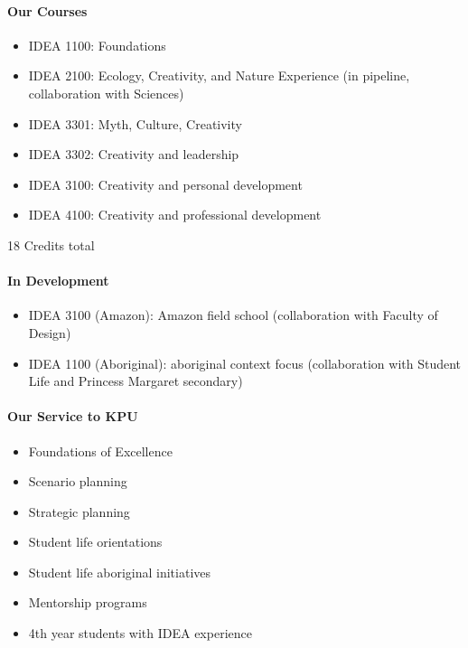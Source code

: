 \documentclass[letterpaper,10pt,headsepline]{scrreprt}
\begin{document}
\paragraph{Our Courses}

\begin{itemize}
\itemsep1pt\parskip0pt
\item
  IDEA 1100: Foundations
\item
  IDEA 2100: Ecology, Creativity, and Nature Experience (in pipeline,
  collaboration with Sciences)
\item
  IDEA 3301: Myth, Culture, Creativity
\item
  IDEA 3302: Creativity and leadership
\item
  IDEA 3100: Creativity and personal development
\item
  IDEA 4100: Creativity and professional development
\end{itemize}

18 Credits total

\paragraph{In Development}

\begin{itemize}
\itemsep1pt\parskip0pt
\item
  IDEA 3100 (Amazon): Amazon field school (collaboration with Faculty of
  Design)
\item
  IDEA 1100 (Aboriginal): aboriginal context focus (collaboration with
  Student Life and Princess Margaret secondary)
\end{itemize}

\paragraph{Our Service to KPU}

\begin{itemize}
\itemsep1pt\parskip0pt
\item
  Foundations of Excellence
\item
  Scenario planning
\item
  Strategic planning
\item
  Student life orientations
\item
  Student life aboriginal initiatives
\item
  Mentorship programs
\item
  4th year students with IDEA experience
\end{itemize}
\end{document}
